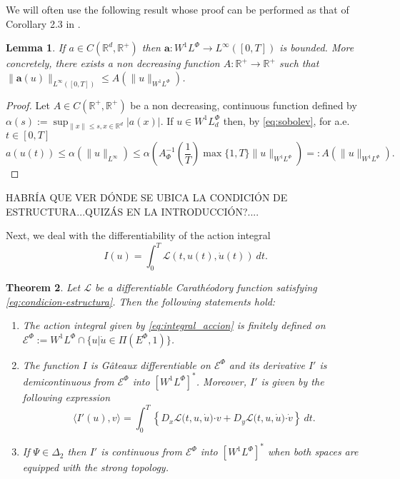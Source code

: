 \documentclass[twoside]{article}
\newtheorem{thm}{Theorem}[section]
\newtheorem{lem}[thm]{Lemma}
\theoremstyle{remark}
\newcommand{\lphi}{L^{\Phi}}
\newcommand{\ephi}{E^{\Phi}}
\newcommand{\wphi}{W^{1}\lphi}
\newcommand{\sobnor}{\|_{W^{1}\lphi}}
\newcommand{\domi}{\mathcal{E}^{\Phi}}
\renewcommand{\b}[1]{\boldsymbol{#1}}
\newcommand{\rr}{\mathbb{R}}
\newcommand{\ccdot}{\b{\cdot}}
\renewcommand{\leq}{\leqslant}
\begin{document}
We will often use the following result whose proof can be performed as that of  Corollary 2.3 in \cite{ABGMS2015}. 
\begin{lem}\label{lem:cota-a}
\label{a_bound} If $a\in C(\mathbb{R}^d,\mathbb{R}^+)$ then $\b{a}:\wphi\to L^{\infty}([0,T])$ is bounded. 
More concretely,  there exists a non decreasing function $A:\mathbb{R}^+\to\mathbb{R}^+$ such that
 $\|\b{a}(u)\|_{L^{\infty}([0,T])}\leq A(\|u\|_{\wphi})$.
\end{lem}


\begin{proof}  Let $A \in C(\mathbb{R}^+,\mathbb{R}^+)$ be a  non decreasing, continuous function defined by  
$\alpha(s):=\sup_{\|x\|\leq s, x \in \rr^d}|a(x)|$.  If $u \in \wphi_d$ then, by  \ref{eq:sobolev}, for a.e. $t\in [0,T]$
\[a(u(t))\leq \alpha (\|u\|_{L^{\infty}})\leq 
\alpha \left(
A_\Phi^{-1}\left(\frac{1}{T}\right)\max\{1,T\}\|u\sobnor\right)=: 
A(\|u\sobnor).\]
\end{proof}



HABR\'IA QUE VER D\'ONDE SE UBICA LA CONDICI\'ON DE ESTRUCTURA...QUIZ\'AS EN LA INTRODUCCI\'ON?....


Next, we deal with the differentiability of the action integral 
\begin{equation}\label{eq:integral_accion}
I(u)=\int_{0}^T \mathcal{L}(t,u(t),\dot{u}(t))\ dt.
\end{equation}

\begin{thm}\label{teo:diferenciabilidad}
Let $\mathcal{L}$ be a differentiable Carath\'eodory function satisfying \eqref{eq:condicion-estructura}.
Then the following statements hold:
\begin{enumerate}
\item \label{it:T1item1} \label{A1} The action integral given by \eqref{eq:integral_accion}
is finitely defined on $\domi:=W^{1}\lphi\cap\{u|\dot{u}\in\Pi(\ephi,1)\}$.

\item\label{it:T1item3} The function  $I$ is G\^ateaux differentiable on $\domi$ and  its derivative $I'$ is demicontinuous from 
$\domi$  into $\left[\wphi \right]^*$. Moreover, $I'$ is given by the following expression
\begin{equation}\label{eq:DerAccion}
\langle  I'(u),v\rangle= \int_0^T \left\{D_{x}\mathcal{L}\big(t,u,\dot{u}\big)\ccdot v
+ D_{y}\mathcal{L}\big(t,u,\dot{u}\big)\ccdot\dot{v}\right\} \ dt.
\end{equation}

\item\label{it:T1item4}  If  $\Psi \in \Delta_2$ then 
  $I'$ is continuous from $\domi$ into $\left[\wphi\right]^*$ when both spaces are equipped with the strong topology.
\end{enumerate}
\end{thm}
\end{document}
